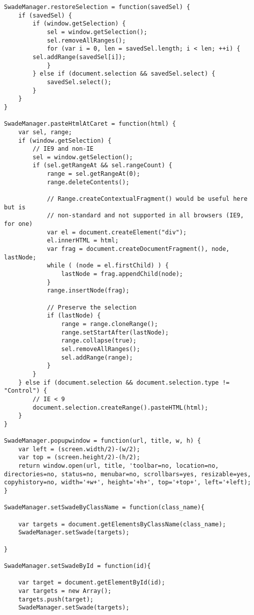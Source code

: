 \begin{lstlisting}
SwadeManager.restoreSelection = function(savedSel) {
    if (savedSel) {
        if (window.getSelection) {
            sel = window.getSelection();
            sel.removeAllRanges();
            for (var i = 0, len = savedSel.length; i < len; ++i) {
		sel.addRange(savedSel[i]);
            }
        } else if (document.selection && savedSel.select) {
            savedSel.select();
        }
    }
}

SwadeManager.pasteHtmlAtCaret = function(html) {
    var sel, range;
    if (window.getSelection) {
        // IE9 and non-IE
        sel = window.getSelection();
        if (sel.getRangeAt && sel.rangeCount) {
            range = sel.getRangeAt(0);
            range.deleteContents();

            // Range.createContextualFragment() would be useful here but is
            // non-standard and not supported in all browsers (IE9, for one)
            var el = document.createElement("div");
            el.innerHTML = html;
            var frag = document.createDocumentFragment(), node, lastNode;
            while ( (node = el.firstChild) ) {
                lastNode = frag.appendChild(node);
            }
            range.insertNode(frag);

            // Preserve the selection
            if (lastNode) {
                range = range.cloneRange();
                range.setStartAfter(lastNode);
                range.collapse(true);
                sel.removeAllRanges();
                sel.addRange(range);
            }
        }
    } else if (document.selection && document.selection.type != "Control") {
        // IE < 9
        document.selection.createRange().pasteHTML(html);
    }
}

SwadeManager.popupwindow = function(url, title, w, h) {
    var left = (screen.width/2)-(w/2);
    var top = (screen.height/2)-(h/2);
    return window.open(url, title, 'toolbar=no, location=no, directories=no, status=no, menubar=no, scrollbars=yes, resizable=yes, copyhistory=no, width='+w+', height='+h+', top='+top+', left='+left);
}

SwadeManager.setSwadeByClassName = function(class_name){

    var targets = document.getElementsByClassName(class_name);
    SwadeManager.setSwade(targets);

}

SwadeManager.setSwadeById = function(id){

    var target = document.getElementById(id);
    var targets = new Array();
    targets.push(target);
    SwadeManager.setSwade(targets);


\end{lstlisting}
